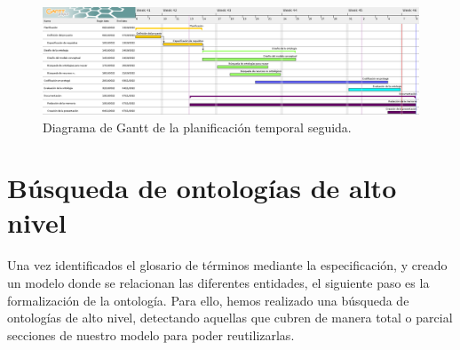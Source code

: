 \documentclass[a4paper,12pt]{article}
\begin{document}
	\begin{figure}[H]
		\centering
		\includegraphics[width=\textwidth]{include/gantt_ontologia.png}
		\caption{Diagrama de Gantt de la planificación temporal seguida.}
	\end{figure}
	
	\section{Búsqueda de ontologías de alto nivel}
	
	Una vez identificados el glosario de términos mediante la especificación, y creado un modelo donde se relacionan las diferentes entidades, el siguiente paso es la formalización de la ontología. Para ello, hemos realizado una búsqueda de ontologías de alto nivel, detectando aquellas que cubren de manera total o parcial secciones de nuestro modelo para poder reutilizarlas.
	
\end{document}
